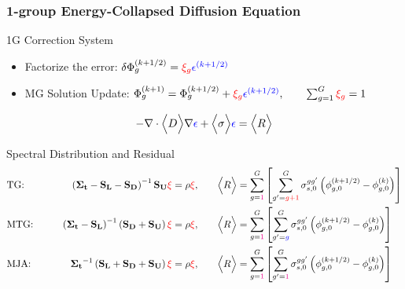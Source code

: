 \documentclass[compress,10pt]{beamer}
\renewcommand{\vec}[1]{\mathbf{#1}}
\newcommand{\tcr}[1]{\textcolor{red}{#1}}
\newcommand{\tcb}[1]{\textcolor{blue}{#1}}
\newcommand{\tcm}[1]{\textcolor{magenta}{#1}}
\begin{document}
\begin{frame}[t]\frametitle{1-group Energy-Collapsed Diffusion Equation}
\begin{block}{1G Correction System}{\footnotesize
\begin{itemize}
\item Factorize the error: $\delta \Phi_{g}^{(k+1/2)} = \tcr{\xi_g} \tcb{\epsilon^{(k+1/2)}}$
\item MG Solution Update:  $ \Phi_{g}^{(k+1)} =  \Phi_{g}^{(k+1/2)} + \tcr{\xi_g} \tcb{\epsilon^{(k+1/2)}}, \qquad \sum\displaylimits_{g=1}^{G} \tcr{\xi_g} = 1 $ 
\end{itemize}
\vspace{3mm}
\begin{equation*}
-\vec{\nabla} \cdot \Big< D \Big> \vec{\nabla} \tcb{\epsilon} + \Big< \sigma \Big> \tcb{\epsilon} = \Big< R \Big>
\end{equation*}
}\end{block}
\begin{block}{Spectral Distribution and Residual}{\footnotesize
\begin{equation*}
\begin{aligned}
&\text{TG:} \qquad    & \left(  {\bf \Sigma_t} - {\bf S_{L}} - {\bf S_{D}} \right)^{-1} {\bf S_{U}} {\bf \tcr{\xi}} = \rho {\bf \tcr{\xi}}, \qquad &\Big< R \Big>=\sum\limits_{g=\tcm{1}}^G \left[ \sum\limits_{g'=\tcr{g+1}}^G \sigma_{s,0}^{gg'} \left( \phi_{g,0}^{(k+1/2)} - \phi_{g,0}^{(k)}  \right)\right]\\
&\text{MTG:} \qquad & \left(  {\bf \Sigma_t} - {\bf S_{L}}  \right)^{-1} \left( {\bf S_{D}} + {\bf S_{U}} \right) {\bf \tcr{\xi}} = \rho {\bf \tcr{\xi}}, \qquad &\Big< R \Big>=\sum\limits_{g=\tcm{1}}^G \left[ \sum\limits_{g'=\tcb{g}}^G \sigma_{s,0}^{gg'} \left( \phi_{g,0}^{(k+1/2)} - \phi_{g,0}^{(k)}  \right)\right]\\
&\text{MJA:} \qquad & {\bf \Sigma_t}^{-1} \left( {\bf S_L} + {\bf S_D} +{\bf S_U} \right) {\bf \tcr{\xi}} = \rho {\bf \tcr{\xi}}, \qquad &\Big< R \Big>=\sum\limits_{g=\tcm{1}}^G \left[ \sum\limits_{g'=\tcm{1}}^G \sigma_{s,0}^{gg'} \left( \phi_{g,0}^{(k+1/2)} - \phi_{g,0}^{(k)}  \right)\right]\\
\end{aligned}
\end{equation*}
}\end{block}
\end{frame}
\end{document}

